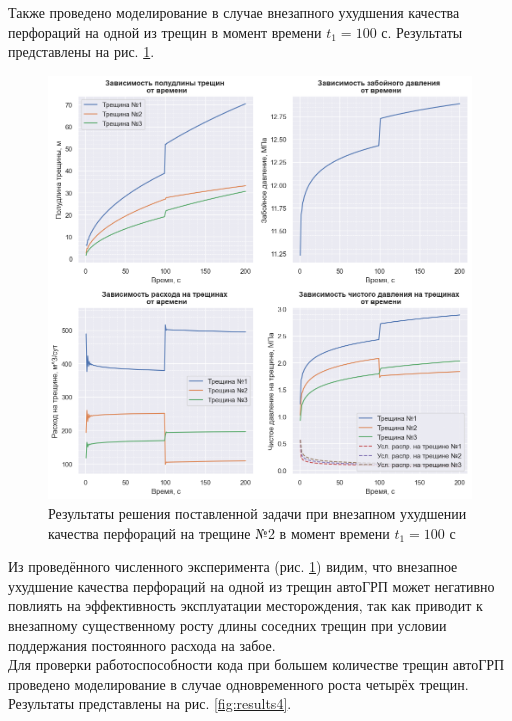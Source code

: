 Также проведено моделирование в случае внезапного ухудшения качества перфораций на одной из трещин в момент времени $t_1=100\text{ с}$.
Результаты представлены на рис. \ref{fig:results3}.

\begin{figure}[H] 
\center
\includegraphics[width=0.85\linewidth]{images/Kirchhoff+Koning_3.png}
\caption{Результаты решения поставленной задачи при внезапном ухудшении качества перфораций на трещине №2 в момент времени $t_1=100\text{ с}$} 
\label{fig:results3}  
\end{figure}

Из проведённого численного эксперимента (рис. \ref{fig:results3}) видим, что внезапное ухудшение качества перфораций на одной из трещин автоГРП может негативно повлиять на эффективность эксплуатации месторождения, так как приводит к внезапному существенному росту длины соседних трещин при условии поддержания постоянного расхода на забое.\\

Для проверки работоспособности кода при большем количестве трещин автоГРП проведено моделирование в случае одновременного роста четырёх трещин.
Результаты представлены на рис. \ref{fig:results4}.

